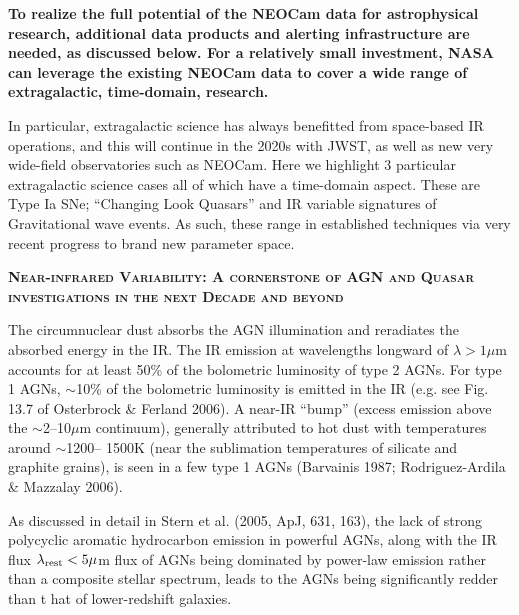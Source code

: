 \documentclass[12pt]{article}
\begin{document}
\smallskip
\smallskip
\noindent
{\bf To realize the full potential of the NEOCam data for astrophysical research, additional data products and alerting infrastructure are needed, as discussed below. For a relatively small investment, NASA can leverage the existing NEOCam data to cover a wide range of extragalactic, time-domain, research.}


\smallskip
\smallskip
\noindent
In particular, extragalactic science has always benefitted from space-based IR operations, and this will continue in the 2020s with JWST, as well as new very wide-field observatories such as NEOCam. 
Here we highlight 3 particular extragalactic science cases all of which have a time-domain aspect. These are Type Ia SNe; ``Changing Look Quasars'' and IR variable signatures of Gravitational wave events. As such, these range in established techniques via very recent progress to brand new parameter space. 

\smallskip
\smallskip
\noindent
{\bfseries \textsc{\textcolor{Cerulean}{
Near-infrared Variability: A cornerstone of AGN and Quasar investigations in the next Decade and beyond
}}}


\smallskip
\smallskip
\noindent

The circumnuclear dust absorbs the AGN illumination and reradiates the absorbed energy in the IR. The IR emission at wavelengths longward of $\lambda > 1 \mu$m accounts for at least 50\% of the bolometric luminosity of type 2 AGNs. For type 1 AGNs, $\sim$10\% of the bolometric luminosity is emitted in the IR (e.g. see Fig. 13.7 of Osterbrock \& Ferland 2006). A near-IR ``bump'' (excess emission above the $\sim$2–10$\mu$m continuum), generally attributed to hot dust with temperatures around $\sim$1200– 1500K (near the sublimation temperatures of silicate and graphite grains), is seen in a few type 1 AGNs (Barvainis 1987; Rodriguez-Ardila \& Mazzalay 2006).

\smallskip
\smallskip
\noindent
As discussed in detail in Stern et al. (2005, ApJ, 631, 163), the lack of strong polycyclic aromatic hydrocarbon emission in powerful AGNs, along with the IR flux $\lambda_{\rm rest} < 5 \mu$m flux of AGNs being dominated by power-law emission rather than a composite stellar spectrum, leads to the  AGNs being significantly redder than t
hat of lower-redshift galaxies. 
\end{document}
